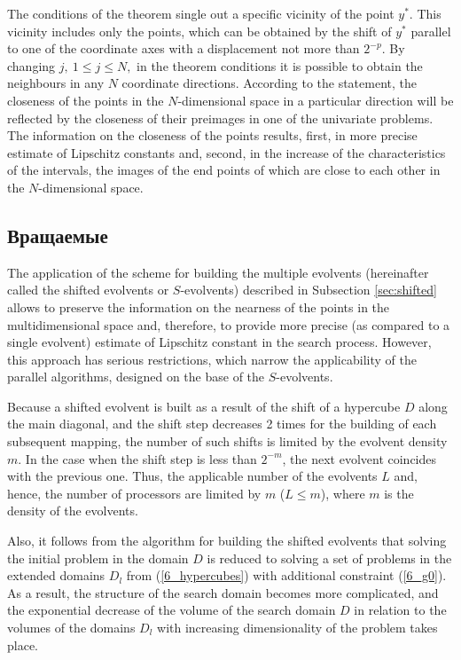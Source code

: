 \documentclass[runningheads]{llncs}
\begin{document}
The conditions of the theorem single out a specific vicinity of the point $y^\ast$. This vicinity includes only the points, which can be obtained by the shift of $y^\ast$ parallel to one of the coordinate axes with a displacement not more than $2^{-p}$. By changing  $j,\ 1\leq j\leq N,$ in the theorem conditions it is possible to obtain the neighbours in any $N$ coordinate directions. According to the statement, the closeness of the points in the $N$-dimensional space in a particular direction will be reflected by the closeness of their preimages in one of the univariate problems. The information on the closeness of the points results, first, in more precise estimate of Lipschitz constants and, second, in the increase of the characteristics of the intervals, the images of the end points of which are close to each other in the $N$-dimensional space.

\subsection{Вращаемые}
The application of the scheme for building the multiple evolvents (hereinafter called the shifted evolvents or $S$-evolvents) described in Subsection \ref{sec:shifted} allows to preserve the information on the nearness of the points in the multidimensional space and, therefore, to provide more precise (as compared to a single evolvent) estimate of Lipschitz constant in the search process. However, this approach has serious restrictions, which narrow the applicability of the parallel algorithms, designed on the base of the $S$-evolvents.

Because a shifted evolvent is built as a result of the shift of a hypercube $D$ along the main diagonal, and the shift step decreases 2 times for the building of each subsequent mapping, the number of such shifts is limited by the evolvent density $m$. In the case when the shift step is less than $2^{-m}$, the next evolvent coincides with the previous one. Thus, the applicable number of the evolvents $L$ and, hence, the number of processors are limited by $m$ ($L\leq m$), where $m$ is the density of the evolvents.

Also, it follows from the algorithm for building the shifted evolvents that solving the initial problem in the domain $D$ is reduced to solving a set of problems in the extended domains $D_l$ from (\ref{6_hypercubes}) with additional constraint (\ref{6_g0}). As a result, the structure of the search domain becomes more complicated, and the exponential decrease of the volume of the search domain $D$ in relation to the volumes of the domains $D_l$ with increasing dimensionality of the problem takes place.
\end{document}
